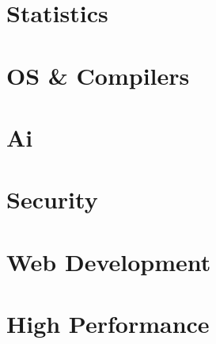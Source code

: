 \section{Statistics}
\hypertarget{cat:stat}{}


\section{OS \& Compilers}
\hypertarget{cat:os}{}



\section{Ai}
\hypertarget{cat:ai}{}



\section{Security}
\hypertarget{cat:security}{}


\section{Web Development}
\hypertarget{cat:web}{}



\section{High Performance}
\hypertarget{cat:hp}{}


